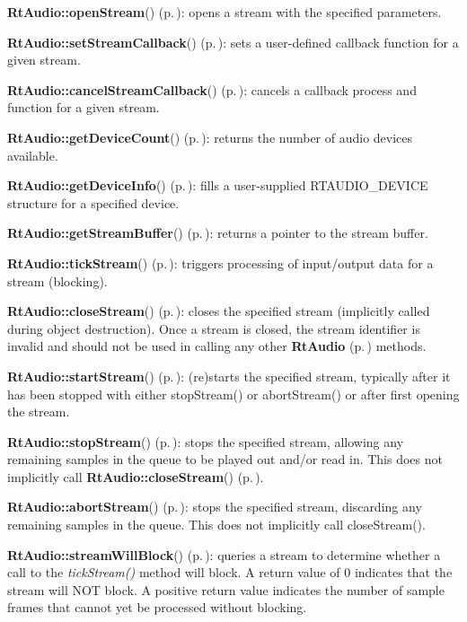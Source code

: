 \begin{CompactItemize}
 \item 
{\bf Rt\-Audio::open\-Stream}() {\rm (p.\,\pageref{classRtAudio_a3})}: opens a stream with the specified parameters. \item 
{\bf Rt\-Audio::set\-Stream\-Callback}() {\rm (p.\,\pageref{classRtAudio_a4})}: sets a user-defined callback function for a given stream. \item 
{\bf Rt\-Audio::cancel\-Stream\-Callback}() {\rm (p.\,\pageref{classRtAudio_a5})}: cancels a callback process and function for a given stream. \item 
{\bf Rt\-Audio::get\-Device\-Count}() {\rm (p.\,\pageref{classRtAudio_a6})}: returns the number of audio devices available. \item 
{\bf Rt\-Audio::get\-Device\-Info}() {\rm (p.\,\pageref{classRtAudio_a7})}: fills a user-supplied RTAUDIO\_\-DEVICE structure for a specified device. \item 
{\bf Rt\-Audio::get\-Stream\-Buffer}() {\rm (p.\,\pageref{classRtAudio_a8})}: returns a pointer to the stream buffer. \item 
{\bf Rt\-Audio::tick\-Stream}() {\rm (p.\,\pageref{classRtAudio_a9})}: triggers processing of input/output data for a stream (blocking). \item 
{\bf Rt\-Audio::close\-Stream}() {\rm (p.\,\pageref{classRtAudio_a10})}: closes the specified stream (implicitly called during object destruction). Once a stream is closed, the stream identifier is invalid and should not be used in calling any other {\bf Rt\-Audio} {\rm (p.\,\pageref{classRtAudio})} methods. \item 
{\bf Rt\-Audio::start\-Stream}() {\rm (p.\,\pageref{classRtAudio_a11})}: (re)starts the specified stream, typically after it has been stopped with either stop\-Stream() or abort\-Stream() or after first opening the stream. \item 
{\bf Rt\-Audio::stop\-Stream}() {\rm (p.\,\pageref{classRtAudio_a12})}: stops the specified stream, allowing any remaining samples in the queue to be played out and/or read in. This does not implicitly call {\bf Rt\-Audio::close\-Stream}() {\rm (p.\,\pageref{classRtAudio_a10})}. \item 
{\bf Rt\-Audio::abort\-Stream}() {\rm (p.\,\pageref{classRtAudio_a13})}: stops the specified stream, discarding any remaining samples in the queue. This does not implicitly call close\-Stream(). \item 
{\bf Rt\-Audio::stream\-Will\-Block}() {\rm (p.\,\pageref{classRtAudio_a14})}: queries a stream to determine whether a call to the {\em tick\-Stream()} method will block. A return value of 0 indicates that the stream will NOT block. A positive return value indicates the number of sample frames that cannot yet be processed without blocking. \end{CompactItemize}


